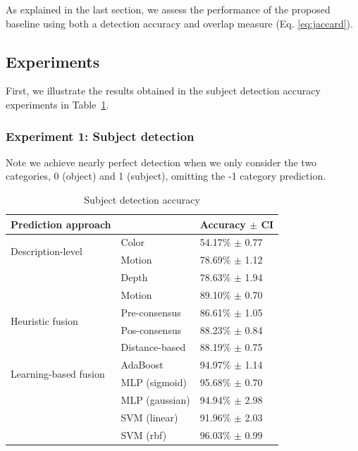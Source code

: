 \documentclass[10pt,twocolumn,letterpaper]{article}
\begin{document}
As explained in the last section, we assess the performance of the proposed baseline using both a detection accuracy and overlap measure (Eq. \ref{eq:jaccard}). 

\subsection{Experiments}

First, we illustrate the results obtained in the subject detection accuracy experiments in Table~\ref{tab:subject_detection_accuracy}. 

\subsubsection{Experiment 1: Subject detection}

Note we achieve nearly perfect  detection when we only consider the two categories, 0 (object) and 1 (subject), omitting the -1 category prediction.

\begin{table}[ht]
\caption{Subject detection accuracy}
\begin{center}
\begin{tabular}{lll}
    \hline
    Prediction approach & & Accuracy $\pm$ CI \\
    \hline
    \multirow{2}{*}{Description-level} & Color & 54.17\% $\pm$ 0.77 \\
    & Motion & 78.69\% $\pm$ 1.12\\
    & Depth & 78.63\% $\pm$ 1.94\\
    & Motion & 89.10\% $\pm$ 0.70\\
    \hline
    \multirow{2}{*}{Heuristic fusion} & Pre-consensus & 86.61\% $\pm$ 1.05 \\
    & Pos-consensus & 88.23\% $\pm$ 0.84 \\
    & Distance-based & 88.19\% $\pm$ 0.75 \\
    \hline
    \multirow{2}{*}{Learning-based fusion} & AdaBoost & 94.97\% $\pm$ 1.14 \\
    & MLP (sigmoid) & 95.68\% $\pm$ 0.70 \\
    & MLP (gaussian) & 94.94\% $\pm$ 2.98 \\
    & SVM (linear) & 91.96\% $\pm$ 2.03 \\
    & SVM (rbf) & 96.03\% $\pm$ 0.99 \\
    \hline
\end{tabular}
\end{center}
\label{tab:subject_detection_accuracy}
\end{table}
\end{document}
